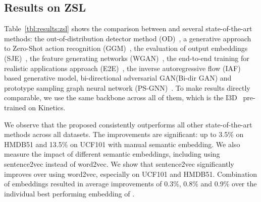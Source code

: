 \documentclass[runningheads]{llncs}
\begin{document}
\subsection{Results on ZSL}
\label{ZSL}

Table~\ref{tbl:results:zsl} shows the comparison between \MethodName and several state-of-the-art methods: the out-of-distribution detector method (OD)~\cite{OD}, a generative approach to Zero-Shot action recognition (GGM)~\cite{GGM2018}, the evaluation of output embeddings (SJE)~\cite{SJE}, the feature generating networks (WGAN)~\cite{clswgan}, the end-to-end training for realistic applications approach (E2E)~\cite{e2e}, the inverse autoregressive flow (IAF) based generative model, bi-directional adversarial GAN(Bi-dir GAN) \cite{syn} and prototype sampling graph neural network (PS-GNN)~\cite{psgnn}. To make results directly comparable, we use the same backbone across all of them, which is the I3D~\cite{i3d} pre-trained on Kinetics.

We observe that the proposed \MethodName consistently outperforms all other state-of-the-art methods across all datasets. The improvements are significant: up to 3.5\% on HMDB51 and 13.5\% on UCF101 with manual semantic embedding. 
We also measure the impact of different semantic embeddings, including using sentence2vec instead of word2vec. We show that sentence2vec significantly improves over using word2vec, especially on UCF101 and HMDB51. Combination of embeddings resulted in average improvements of 0.3\%, 0.8\% and 0.9\% over the individual best performing embedding of \MethodName.
 
\end{document}
